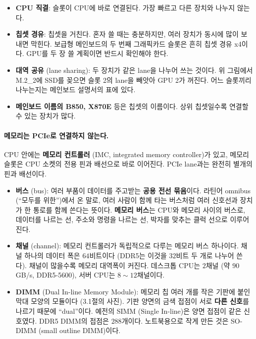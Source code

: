 \documentclass[11pt,a4paper]{article}
\begin{document}
\begin{itemize}[leftmargin=1.5em]
\item \textbf{CPU 직결}: 슬롯이 CPU에 바로 연결된다. 가장 빠르고 다른 장치와 나누지 않는다.
\item \textbf{칩셋 경유}: 칩셋을 거친다. 혼자 쓸 때는 충분하지만, 여러 장치가 동시에 많이 보내면 막힌다.
보급형 메인보드의 두 번째 그래픽카드 슬롯은 흔히 칩셋 경유 x4이다. GPU를 두 장 쓸 계획이면 반드시 확인해야 한다.
\item \textbf{대역 공유} (lane sharing): 두 장치가 같은 lane을 나누어 쓰는 것이다. 위 그림에서 M.2\_2에 SSD를 꽂으면 슬롯 2의 lane을 빼앗아 GPU 2가 꺼진다.
어느 슬롯끼리 나누는지는 메인보드 설명서의 표에 있다.
\item \textbf{메인보드 이름의 B850, X870E} 등은 칩셋의 이름이다. 상위 칩셋일수록 연결할 수 있는 장치가 많다.
\end{itemize}

\paragraph{메모리는 PCIe로 연결하지 않는다.}
CPU 안에는 \textbf{메모리 컨트롤러} (IMC, integrated memory controller)가 있고, 메모리 슬롯은 CPU 소켓의 전용 핀과 배선으로 바로 이어진다.
PCIe lane과는 완전히 별개의 핀과 배선이다.

\begin{itemize}[leftmargin=1.5em]
\item \textbf{버스} (bus): 여러 부품이 데이터를 주고받는 \textbf{공용 전선 묶음}이다.
라틴어 omnibus (``모두를 위한'')에서 온 말로, 여러 사람이 함께 타는 버스처럼 여러 신호선과 장치가 한 통로를 함께 쓴다는 뜻이다.
\textbf{메모리 버스}는 CPU와 메모리 사이의 버스로, 데이터를 나르는 선, 주소와 명령을 나르는 선, 박자를 맞추는 클럭 선으로 이루어진다.
\item \textbf{채널} (channel): 메모리 컨트롤러가 독립적으로 다루는 메모리 버스 하나이다. 채널 하나의 데이터 폭은 $64$비트이다 (DDR5는 이것을 $32$비트 두 개로 나누어 쓴다).
채널이 많을수록 메모리 대역폭이 커진다. 데스크톱 CPU는 $2$채널 (약 $90$ GB/s, DDR5-5600), 서버 CPU는 $8\sim12$채널이다.
\item \textbf{DIMM} (Dual In-line Memory Module): 메모리 칩 여러 개를 작은 기판에 붙인 막대 모양의 모듈이다 (3.1절의 사진).
기판 양면의 금색 접점이 서로 \textbf{다른 신호}를 나르기 때문에 ``dual''이다. 예전의 SIMM (Single In-line)은 양면 접점이 같은 신호였다.
DDR5 DIMM의 접점은 $288$개이다. 노트북용으로 작게 만든 것은 SO-DIMM (small outline DIMM)이다.
\end{itemize}
\end{document}
